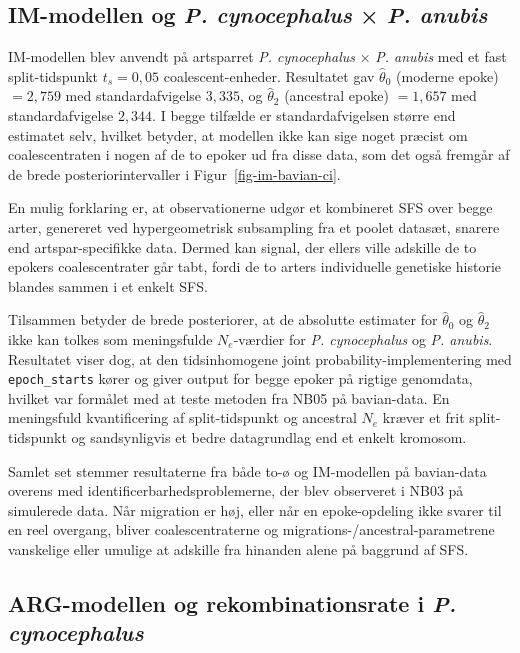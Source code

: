 \documentclass[
  10pt,
  a4paper,
]{scrbook}
\let\oldemph\emph
\renewcommand\emph[1]{\oldemph{\color{gray}#1}}
\begin{document}
\subsection{\texorpdfstring{IM-modellen og \emph{P. cynocephalus} ×
\emph{P.
anubis}}{IM-modellen og P. cynocephalus × P. anubis}}\label{im-modellen-og-p.-cynocephalus-p.-anubis}

IM-modellen blev anvendt på artsparret \emph{P. cynocephalus} × \emph{P.
anubis} med et fast split-tidspunkt \(t_s = 0{,}05\) coalescent-enheder.
Resultatet gav \(\hat\theta_0\) (moderne epoke) \(= 2{,}759\) med
standardafvigelse \(3{,}335\), og \(\hat\theta_2\) (ancestral epoke)
\(= 1{,}657\) med standardafvigelse \(2{,}344\). I begge tilfælde er
standardafvigelsen større end estimatet selv, hvilket betyder, at
modellen ikke kan sige noget præcist om coalescentraten i nogen af de to
epoker ud fra disse data, som det også fremgår af de brede
posteriorintervaller i Figur~\ref{fig-im-bavian-ci}.

En mulig forklaring er, at observationerne udgør et kombineret SFS over
begge arter, genereret ved hypergeometrisk subsampling fra et poolet
datasæt, snarere end artspar-specifikke data. Dermed kan signal, der
ellers ville adskille de to epokers coalescentrater går tabt, fordi de
to arters individuelle genetiske historie blandes sammen i et enkelt
SFS.

Tilsammen betyder de brede posteriorer, at de absolutte estimater for
\(\hat\theta_0\) og \(\hat\theta_2\) ikke kan tolkes som meningsfulde
\(N_e\)-værdier for \emph{P. cynocephalus} og \emph{P. anubis}.
Resultatet viser dog, at den tidsinhomogene joint
probability-implementering med \texttt{epoch\_starts} kører og giver
output for begge epoker på rigtige genomdata, hvilket var formålet med
at teste metoden fra NB05 på bavian-data. En meningsfuld kvantificering
af split-tidspunkt og ancestral \(N_e\) kræver et frit split-tidspunkt
og sandsynligvis et bedre datagrundlag end et enkelt kromosom.

Samlet set stemmer resultaterne fra både to-ø og IM-modellen på
bavian-data overens med identificerbarhedsproblemerne, der blev
observeret i NB03 på simulerede data. Når migration er høj, eller når en
epoke-opdeling ikke svarer til en reel overgang, bliver
coalescentraterne og migrations-/ancestral-parametrene vanskelige eller
umulige at adskille fra hinanden alene på baggrund af SFS.

\subsection{\texorpdfstring{ARG-modellen og rekombinationsrate i
\emph{P.
cynocephalus}}{ARG-modellen og rekombinationsrate i P. cynocephalus}}\label{arg-modellen-og-rekombinationsrate-i-p.-cynocephalus}
\end{document}
